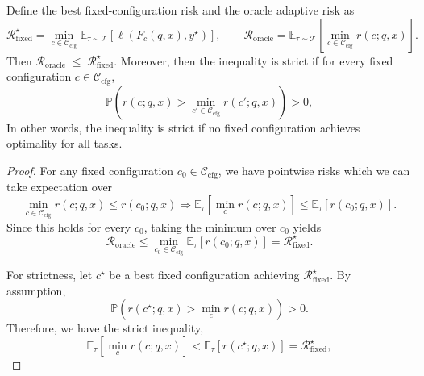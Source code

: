 \documentclass{llmxive}
\begin{document}
{\begin{theorem}
Define the best fixed-configuration risk and the oracle adaptive risk as
\begin{equation}
\mathcal{R}_{\mathrm{fixed}}^\star
=
\min_{c\in\mathcal{C}_{\mathrm{cfg}}}
\mathbb{E}_{\tau\sim\mathcal{T}}[\ell(F_c(q,x),y^\star)],
\qquad
\mathcal{R}_{\mathrm{oracle}}
=
\mathbb{E}_{\tau\sim\mathcal{T}}\!\left[\min_{c\in\mathcal{C}_{\mathrm{cfg}}}r(c;q,x)\right].
\end{equation}
Then $\mathcal{R}_{\mathrm{oracle}}\;\le\;\mathcal{R}_{\mathrm{fixed}}^\star$.
Moreover, then the inequality is strict if for every fixed configuration $c\in\mathcal{C}_{\mathrm{cfg}}$,
\begin{equation}
\mathbb{P}\!\left(
r(c;q,x) >
\min_{c'\in\mathcal{C}_{\mathrm{cfg}}} r(c';q,x)
\right)>0,
\end{equation}
In other words, the inequality is strict if no fixed configuration achieves optimality for all tasks.
\end{theorem}

\begin{proof}
For any fixed configuration $c_0\in\mathcal{C}_{\mathrm{cfg}}$, we have pointwise risks which we can take expectation over
\begin{equation}
\min_{c\in\mathcal{C}_{\mathrm{cfg}}} r(c;q,x)
\le
r(c_0;q,x)
\Longrightarrow
\mathbb{E}_{\tau}\!\left[\min_c r(c;q,x)\right]
\le
\mathbb{E}_{\tau}[r(c_0;q,x)].
\end{equation}
Since this holds for every $c_0$, taking the minimum over $c_0$ yields
\[
\mathcal{R}_{\mathrm{oracle}}
\le
\min_{c_0\in\mathcal{C}_{\mathrm{cfg}}}
\mathbb{E}_{\tau}[r(c_0;q,x)]
=
\mathcal{R}_{\mathrm{fixed}}^\star.
\]

For strictness, let $c^\star$ be a best fixed configuration achieving $\mathcal{R}_{\mathrm{fixed}}^\star$. By assumption,
\[
\mathbb{P}\!\left(
r(c^\star;q,x) >
\min_{c} r(c;q,x)
\right)>0.
\]
Therefore, we have the strict inequality,
\[
\mathbb{E}_{\tau}\!\left[\min_c r(c;q,x)\right]
<
\mathbb{E}_{\tau}[r(c^\star;q,x)]
=
\mathcal{R}_{\mathrm{fixed}}^\star,
\]
\end{proof}


}
\end{document}
